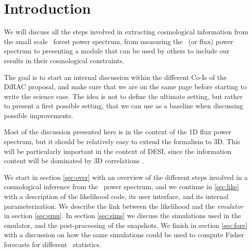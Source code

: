 \section{Introduction} 

We will discuss all the steps involved in extracting cosmological information
from the small scale \lya\ forest power spectrum, from measuring the
\lya\ (or flux) power spectrum to presenting a module that can be used
by others to include our results in their cosmological constraints.

The goal is to start an internal discussion within the different Co-Is
of the DiRAC proposal, and make sure that we are on the same page before
starting to write the science case. 
The idea is not to define the ultimate setting, but rather to present a
first possible setting, that we can use as a baseline when discussing
possible improvements.

Most of the discussion presented here is in the context of the 1D flux power
spectrum, but it should be relatively easy to extend the formalism to 3D.
This will be particularly important in the context of DESI, since the
information content will be dominated by 3D correlations 
\cite{Font-Ribera2014,Font-Ribera2018}.

We start in section \ref{sec:over} with an overview of the different steps 
involved in a cosmological inference from the \lya\ power spectrum, and we 
continue in \ref{sec:like} with a description of the likelihood code, 
its user interface, and its internal parameterization. 
We describe the link between the likelihood and the \textit{emulator} in
section \ref{sec:emu}.
In section \ref{sec:sims} we discuss the simulations used in the emulator, 
and the post-processing of the snapshots. 
We finish in section \ref{sec:fore} with a discussion on how the same
simulations could be used to compute Fisher forecasts for different \lya\
statistics.
 
